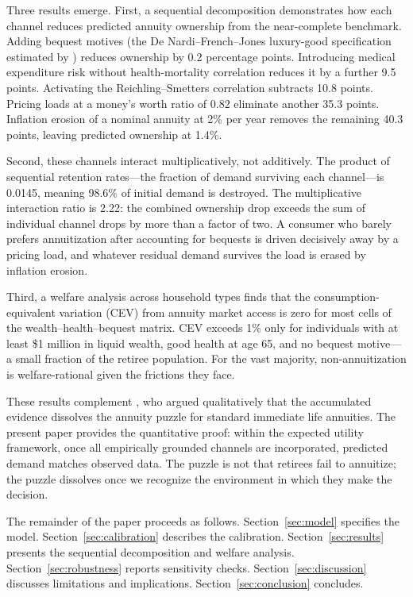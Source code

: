 \documentclass[12pt]{article}
\begin{document}
Three results emerge. First, a sequential decomposition demonstrates how each channel reduces predicted annuity ownership from the near-complete benchmark. Adding bequest motives (the De Nardi--French--Jones luxury-good specification estimated by \citealp{lockwood2012}) reduces ownership by 0.2 percentage points. Introducing medical expenditure risk without health-mortality correlation reduces it by a further 9.5 points. Activating the Reichling--Smetters correlation subtracts 10.8 points. Pricing loads at a money's worth ratio of 0.82 eliminate another 35.3 points. Inflation erosion of a nominal annuity at 2\% per year removes the remaining 40.3 points, leaving predicted ownership at 1.4\%.

Second, these channels interact multiplicatively, not additively. The product of sequential retention rates---the fraction of demand surviving each channel---is 0.0145, meaning 98.6\% of initial demand is destroyed. The multiplicative interaction ratio is 2.22: the combined ownership drop exceeds the sum of individual channel drops by more than a factor of two. A consumer who barely prefers annuitization after accounting for bequests is driven decisively away by a pricing load, and whatever residual demand survives the load is erased by inflation erosion.

Third, a welfare analysis across household types finds that the consumption-equivalent variation (CEV) from annuity market access is zero for most cells of the wealth--health--bequest matrix. CEV exceeds 1\% only for individuals with at least \$1 million in liquid wealth, good health at age 65, and no bequest motive---a small fraction of the retiree population. For the vast majority, non-annuitization is welfare-rational given the frictions they face.

These results complement \citet{tharpforthcoming}, who argued qualitatively that the accumulated evidence dissolves the annuity puzzle for standard immediate life annuities. The present paper provides the quantitative proof: within the expected utility framework, once all empirically grounded channels are incorporated, predicted demand matches observed data. The puzzle is not that retirees fail to annuitize; the puzzle dissolves once we recognize the environment in which they make the decision.

The remainder of the paper proceeds as follows. Section~\ref{sec:model} specifies the model. Section~\ref{sec:calibration} describes the calibration. Section~\ref{sec:results} presents the sequential decomposition and welfare analysis. Section~\ref{sec:robustness} reports sensitivity checks. Section~\ref{sec:discussion} discusses limitations and implications. Section~\ref{sec:conclusion} concludes.
\end{document}
